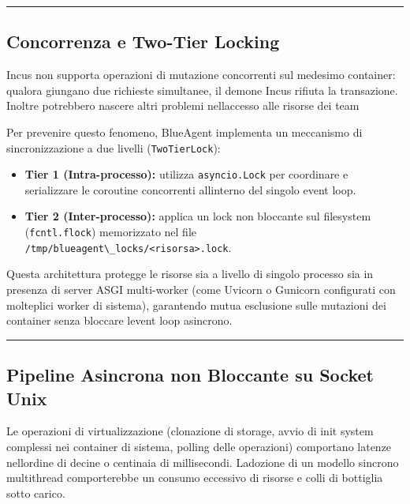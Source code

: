 \begin{center}\rule{0.5\linewidth}{0.5pt}\end{center}

\subsection{Concorrenza e Two-Tier
Locking}\label{concorrenza-e-two-tier-locking}

Incus non supporta operazioni di mutazione concorrenti sul medesimo
container: qualora giungano due richieste simultanee, il demone Incus
rifiuta la transazione. Inoltre potrebbero nascere altri problemi
nell\textquotesingle accesso alle risorse dei team

Per prevenire questo fenomeno, BlueAgent implementa un meccanismo di
sincronizzazione a due livelli (\passthrough{\lstinline!TwoTierLock!}):

\begin{itemize}
\tightlist
\item
  \textbf{Tier 1 (Intra-processo):} utilizza
  \passthrough{\lstinline!asyncio.Lock!} per coordinare e serializzare
  le coroutine concorrenti all\textquotesingle interno del singolo event
  loop.
\item
  \textbf{Tier 2 (Inter-processo):} applica un lock non bloccante sul
  filesystem (\passthrough{\lstinline!fcntl.flock!}) memorizzato nel
  file \passthrough{\lstinline!/tmp/blueagent\_locks/<risorsa>.lock!}.
\end{itemize}

Questa architettura protegge le risorse sia a livello di singolo
processo sia in presenza di server ASGI multi-worker (come Uvicorn o
Gunicorn configurati con molteplici worker di sistema), garantendo mutua
esclusione sulle mutazioni dei container senza bloccare
l\textquotesingle event loop asincrono.

\begin{center}\rule{0.5\linewidth}{0.5pt}\end{center}

\subsection{Pipeline Asincrona non Bloccante su Socket
Unix}\label{pipeline-asincrona-non-bloccante-su-socket-unix}

Le operazioni di virtualizzazione (clonazione di storage, avvio di init
system complessi nei container di sistema, polling delle operazioni)
comportano latenze nell\textquotesingle ordine di decine o centinaia di
millisecondi. L\textquotesingle adozione di un modello sincrono
multithread comporterebbe un consumo eccessivo di risorse e colli di
bottiglia sotto carico.


